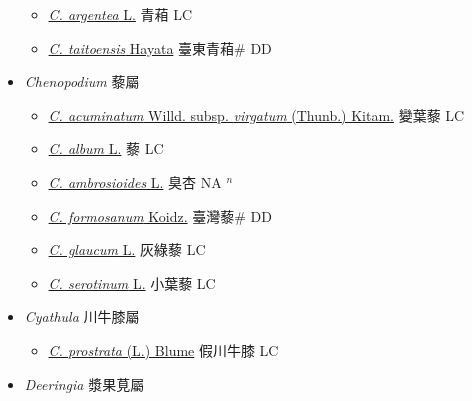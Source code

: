 \begin{itemize}
  \begin{itemize}
        \item[] \href{http://www.theplantlist.org/tpl1.1/search?q=Celosia+argentea}{\textit{C. argentea} L.}   青葙 LC
        \item[] \href{http://www.theplantlist.org/tpl1.1/search?q=Celosia+taitoensis}{\textit{C. taitoensis} Hayata}   臺東青葙\# DD
  \end{itemize}
 \item[] \textit{Chenopodium} 藜屬
                    
  \begin{itemize}
        \item[] \href{http://www.theplantlist.org/tpl1.1/search?q=Chenopodium+acuminatum+subsp.+virgatum}{\textit{C. acuminatum} Willd. subsp. \textit{virgatum} (Thunb.) Kitam.}   變葉藜 LC
        \item[] \href{http://www.theplantlist.org/tpl1.1/search?q=Chenopodium+album}{\textit{C. album} L.}   藜 LC
        \item[] \href{http://www.theplantlist.org/tpl1.1/search?q=Chenopodium+ambrosioides}{\textit{C. ambrosioides} L.}   臭杏 NA $^n$
        \item[] \href{http://www.theplantlist.org/tpl1.1/search?q=Chenopodium+formosanum}{\textit{C. formosanum} Koidz.}   臺灣藜\# DD
        \item[] \href{http://www.theplantlist.org/tpl1.1/search?q=Chenopodium+glaucum}{\textit{C. glaucum} L.}   灰綠藜 LC
        \item[] \href{http://www.theplantlist.org/tpl1.1/search?q=Chenopodium+serotinum}{\textit{C. serotinum} L.}   小葉藜 LC
  \end{itemize}
 \item[] \textit{Cyathula} 川牛膝屬
                    
  \begin{itemize}
        \item[] \href{http://www.theplantlist.org/tpl1.1/search?q=Cyathula+prostrata}{\textit{C. prostrata} (L.) Blume}   假川牛膝 LC
  \end{itemize}
 \item[] \textit{Deeringia} 漿果莧屬
                    

\end{itemize}
